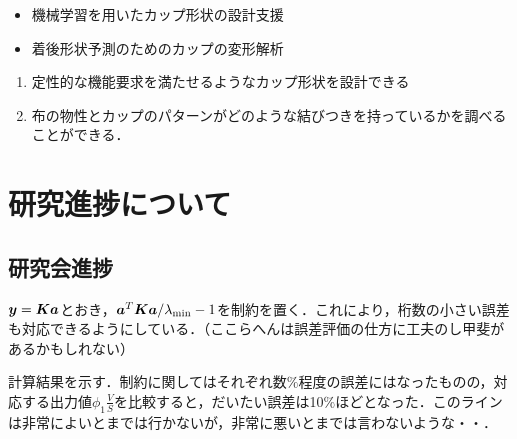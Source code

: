 \documentclass[11pt]{jsarticle}
\begin{document}
	\articleSPRabst
		\begin{itemize}
			\item 機械学習を用いたカップ形状の設計支援
			\item 着後形状予測のためのカップの変形解析
		\end{itemize}
		
		
	\articleSPRobj
		\begin{enumerate}
			\item 定性的な機能要求を満たせるようなカップ形状を設計できる
			\item 布の物性とカップのパターンがどのような結びつきを持っているかを調べることができる．
		\end{enumerate}
	\articleSPRitemsone
		
		\tableofcontents
		
		
	\articleSPRitemstwo
	\renewcommand{\labelitemi}{$\blacktriangledown$}
	\newcommand{\argmax}{\mathop{\rm arg~max}\limits}
	\newcommand{\argmin}{\mathop{\rm arg~min}\limits}
	\newcommand{\Ker}{{\rm Ker}}
	\newcommand{\rank}{{\rm rank}}
	\section{研究進捗について}
		\subsection{研究会進捗}
			$ \boldsymbol{y} = \boldsymbol{K}\boldsymbol{a} $とおき，$ \boldsymbol{a}^T \boldsymbol{K} \boldsymbol{a} / \lambda_{\min} - 1 $を制約を置く．これにより，桁数の小さい誤差も対応できるようにしている．（ここらへんは誤差評価の仕方に工夫のし甲斐があるかもしれない）
			
			計算結果を示す．制約に関してはそれぞれ数$ \% $程度の誤差にはなったものの，対応する出力値$ \phi_1 \frac{V}{S} $を比較すると，だいたい誤差は10$ \% $ほどとなった．このラインは非常によいとまでは行かないが，非常に悪いとまでは言わないような・・．
			
\end{document}
